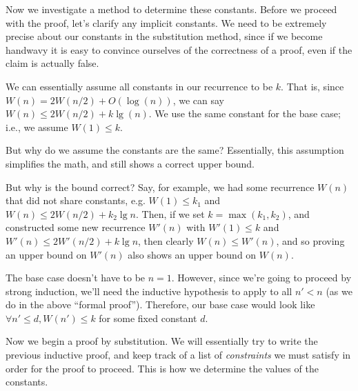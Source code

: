 \begin{flex}
\begin{gram}
Now we investigate a method to determine these constants.
Before we proceed with the proof, let's clarify any implicit constants. We need to be extremely
precise about our constants in the substitution method, since if we become
handwavy it is easy to convince ourselves of the correctness of a proof,
even if the claim is actually false.

We can essentially assume all constants in our recurrence to be $k$. That is,
since $W(n) = 2W(n/2) + O(\log(n))$, we can say $W(n) \leq 2W(n/2) + k \lg(n)$.
We use the same constant for the base case; i.e., we assume $W(1) \leq k$.
\end{gram}

\begin{note}
But why do we assume the constants are the same? Essentially, this assumption
simplifies the math, and still shows a correct upper bound.

But why is the bound correct?
Say, for example, we had some recurrence $W(n)$ that did not share constants,
e.g. $W(1) \leq k_1$ and $W(n) \leq 2W(n/2) + k_2 \lg n$. Then, if we set
$k = \max (k_1, k_2)$, and constructed some new recurrence $W'(n)$ with $W'(1) \leq k$ and
$W'(n) \leq 2W'(n/2) + k \lg n$, then clearly $W(n) \leq W'(n)$, and so
proving an upper bound on $W'(n)$ also shows an upper bound on $W(n)$.
\end{note}

\begin{note}
The base case doesn't have to be $n=1$. However, since we're going to proceed by
strong induction, we'll need the inductive hypothesis to apply to
all $n' < n$ (as we do in the above ``formal proof''). Therefore, our base case
would look like $\forall n' \leq d, W(n') \leq k$ for some fixed constant $d$.
\end{note}
\end{flex}

\begin{gram}
Now we begin a proof by substitution. We will essentially
try to write the previous inductive proof, and keep track of a list of
\textit{constraints} we must satisfy in order for the proof to proceed.
This is how we determine the values of the constants.
\end{gram}

